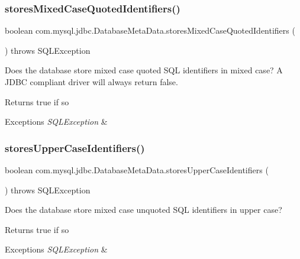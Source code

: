 \subsubsection{\texorpdfstring{stores\+Mixed\+Case\+Quoted\+Identifiers()}{storesMixedCaseQuotedIdentifiers()}}
{\footnotesize\ttfamily boolean com.\+mysql.\+jdbc.\+Database\+Meta\+Data.\+stores\+Mixed\+Case\+Quoted\+Identifiers (\begin{DoxyParamCaption}{ }\end{DoxyParamCaption}) throws S\+Q\+L\+Exception}

Does the database store mixed case quoted S\+QL identifiers in mixed case? A J\+D\+BC compliant driver will always return false.

\begin{DoxyReturn}{Returns}
true if so 
\end{DoxyReturn}

\begin{DoxyExceptions}{Exceptions}
{\em S\+Q\+L\+Exception} & \\
\hline
\end{DoxyExceptions}
\mbox{\label{classcom_1_1mysql_1_1jdbc_1_1_database_meta_data_af0fcbeeedd6fdcc5097dec36fedb87dd}} 
\subsubsection{\texorpdfstring{stores\+Upper\+Case\+Identifiers()}{storesUpperCaseIdentifiers()}}
{\footnotesize\ttfamily boolean com.\+mysql.\+jdbc.\+Database\+Meta\+Data.\+stores\+Upper\+Case\+Identifiers (\begin{DoxyParamCaption}{ }\end{DoxyParamCaption}) throws S\+Q\+L\+Exception}

Does the database store mixed case unquoted S\+QL identifiers in upper case?

\begin{DoxyReturn}{Returns}
true if so 
\end{DoxyReturn}

\begin{DoxyExceptions}{Exceptions}
{\em S\+Q\+L\+Exception} & \\
\hline
\end{DoxyExceptions}
\mbox{\label{classcom_1_1mysql_1_1jdbc_1_1_database_meta_data_aa9da945ccf1459f6732a406f5dc4dbba}} 
